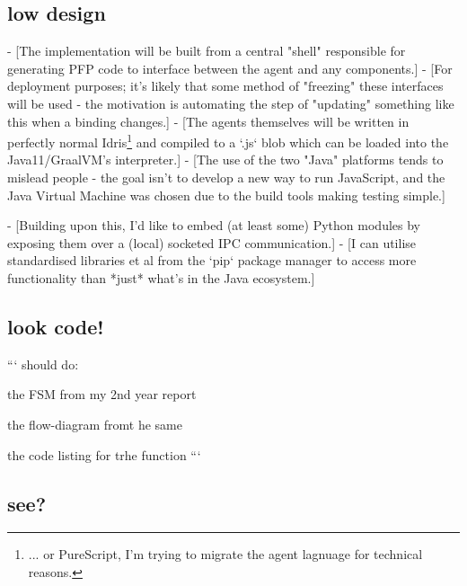 \subsection{low design}

	- [The implementation will be built from a central "shell" responsible for generating PFP code to interface between the agent and any components.]
		- [For deployment purposes; it's likely that some method of "freezing" these interfaces will be used - the motivation is automating the step of "updating" something like this when a binding changes.]
	- [The agents themselves will be written in perfectly normal Idris\footnote{... or PureScript, I'm trying to migrate the agent lagnuage for technical reasons.} and compiled to a `.js` blob which can be loaded into the Java11/GraalVM's interpreter.]
		- [The use of the two "Java" platforms tends to mislead people - the goal isn't to develop a new way to run JavaScript, and the Java Virtual Machine was chosen due to the build tools making testing simple.]


		- [Building upon this, I'd like to embed (at least some) Python modules by exposing them over a (local) socketed IPC communication.]
			- [I can utilise standardised libraries et al from the `pip` package manager to access more functionality than *just* what's in the Java ecosystem.]



\subsection{look code!}

```
should do:

	the FSM from my 2nd year report

	the flow-diagram fromt he same

	the code listing for trhe function
```

\subsection{see?}






